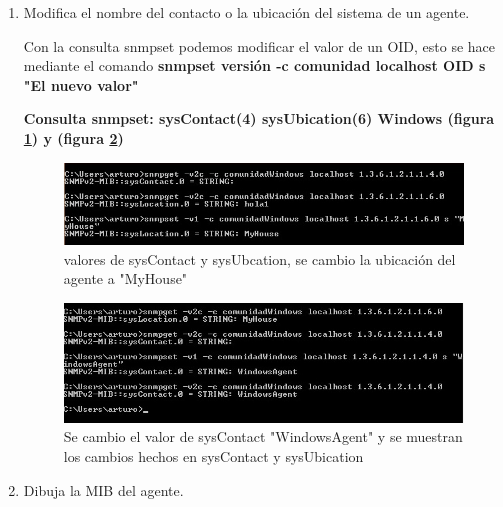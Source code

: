 \begin{enumerate}
\item Modifica el nombre del contacto o la ubicación del sistema de un agente.

Con la consulta snmpset podemos modificar el valor de un OID, esto se hace mediante el comando \textbf{snmpset versión -c comunidad localhost OID s "El nuevo valor"}

\textbf{Consulta snmpset: sysContact(4) sysUbication(6) Windows (figura \ref{image:131}) y (figura \ref{image:132})}
\FloatBarrier
\begin{figure}[htbp!]
		\centering
	\includegraphics[width=.9 \textwidth]{images/131}
		\caption{valores de sysContact y sysUbcation, se cambio la ubicación del agente a "MyHouse"}		\label{image:131}
\end{figure}
\begin{figure}[htbp!]
		\centering
	\includegraphics[width=.9 \textwidth]{images/132}
		\caption{Se cambio el valor de sysContact "WindowsAgent" y se muestran los cambios hechos en sysContact y sysUbication}		\label{image:132}
\end{figure}
\FloatBarrier


\item Dibuja la MIB del agente.


\end{enumerate}
